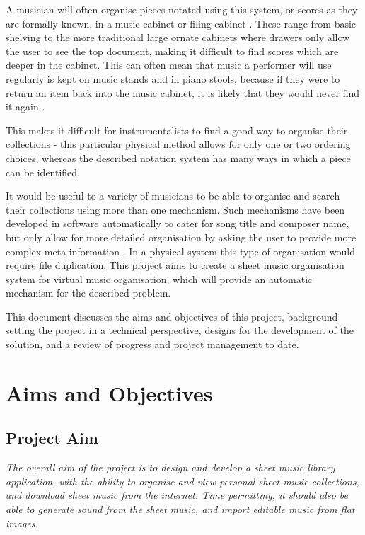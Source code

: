A musician will often organise pieces notated using this system, or scores as they are formally known, in a music cabinet or filing cabinet \parencite{musicOrganising}. These range from basic shelving to the more traditional large ornate cabinets where drawers only allow the user to see the top document, making it difficult to find scores which are deeper in the cabinet. This can often mean that music a performer will use regularly is kept on music stands and in piano stools, because if they were to return an item back into the music cabinet, it is likely that they would never find it again \parencite{SheetMusicRant}.

This makes it difficult for instrumentalists to find a good way to organise their collections - this particular physical method allows for only one or two ordering choices, whereas the described notation system has many ways in which a piece can be identified. 

It would be useful to a variety of musicians to be able to organise and search their collections using more than one mechanism. Such mechanisms have been developed in software automatically to cater for song title and composer name, but only allow for more detailed organisation by asking the user to provide more complex meta information \parencite{calypso}. In a physical system this type of organisation would require file duplication. This project aims to create a sheet music organisation system for virtual music organisation, which will provide an automatic mechanism for the described problem.

This document discusses the aims and objectives of this project, background setting the project in a technical perspective, designs for the development of the solution, and a review of progress and project management to date. 
\pagebreak
\section{Aims and Objectives}
\subsection{Project Aim}
\begin{center}
\textit{The overall aim of the project is to design and develop a sheet music library application, with the ability to organise and view personal sheet music collections, and download sheet music from the internet. Time permitting, it should also be able to generate sound from the sheet music, and import editable music from flat images.}
\end{center}
